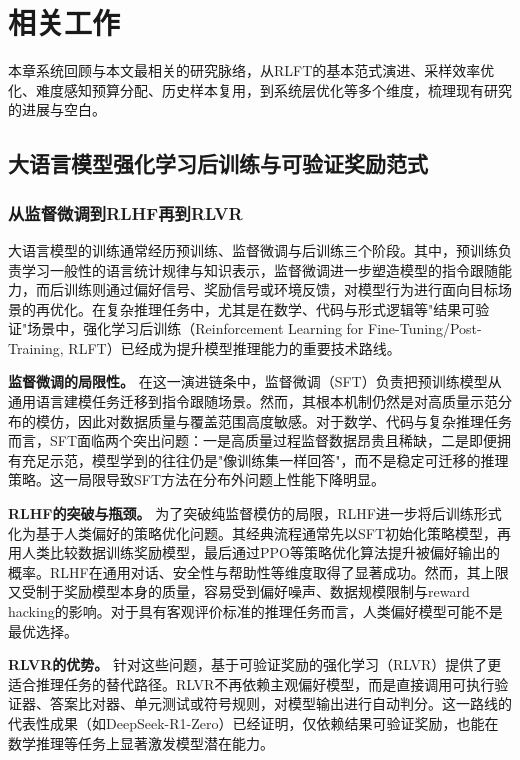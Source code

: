 \chapter{相关工作}
\label{chap:related_work}

本章系统回顾与本文最相关的研究脉络，从RLFT的基本范式演进、采样效率优化、难度感知预算分配、历史样本复用，到系统层优化等多个维度，梳理现有研究的进展与空白。

\section{大语言模型强化学习后训练与可验证奖励范式}
\label{sec:rlft_evolution}

\subsection{从监督微调到RLHF再到RLVR}
\label{subsec:sft_to_rlvr}

大语言模型的训练通常经历预训练、监督微调与后训练三个阶段。其中，预训练负责学习一般性的语言统计规律与知识表示，监督微调进一步塑造模型的指令跟随能力，而后训练则通过偏好信号、奖励信号或环境反馈，对模型行为进行面向目标场景的再优化。在复杂推理任务中，尤其是在数学、代码与形式逻辑等"结果可验证"场景中，强化学习后训练（Reinforcement Learning for Fine-Tuning/Post-Training, RLFT）已经成为提升模型推理能力的重要技术路线。

\textbf{监督微调的局限性。} 在这一演进链条中，监督微调（SFT）负责把预训练模型从通用语言建模任务迁移到指令跟随场景。然而，其根本机制仍然是对高质量示范分布的模仿，因此对数据质量与覆盖范围高度敏感。对于数学、代码与复杂推理任务而言，SFT面临两个突出问题：一是高质量过程监督数据昂贵且稀缺，二是即便拥有充足示范，模型学到的往往仍是"像训练集一样回答"，而不是稳定可迁移的推理策略。这一局限导致SFT方法在分布外问题上性能下降明显。

\textbf{RLHF的突破与瓶颈。} 为了突破纯监督模仿的局限，RLHF进一步将后训练形式化为基于人类偏好的策略优化问题。其经典流程通常先以SFT初始化策略模型，再用人类比较数据训练奖励模型，最后通过PPO等策略优化算法提升被偏好输出的概率。RLHF在通用对话、安全性与帮助性等维度取得了显著成功。然而，其上限又受制于奖励模型本身的质量，容易受到偏好噪声、数据规模限制与reward hacking的影响。对于具有客观评价标准的推理任务而言，人类偏好模型可能不是最优选择。

\textbf{RLVR的优势。} 针对这些问题，基于可验证奖励的强化学习（RLVR）提供了更适合推理任务的替代路径。RLVR不再依赖主观偏好模型，而是直接调用可执行验证器、答案比对器、单元测试或符号规则，对模型输出进行自动判分。这一路线的代表性成果（如DeepSeek-R1-Zero）已经证明，仅依赖结果可验证奖励，也能在数学推理等任务上显著激发模型潜在能力。

